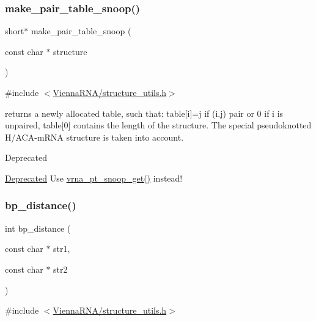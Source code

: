\subsubsection{\texorpdfstring{make\+\_\+pair\+\_\+table\+\_\+snoop()}{make\_pair\_table\_snoop()}}
{\footnotesize\ttfamily short$\ast$ make\+\_\+pair\+\_\+table\+\_\+snoop (\begin{DoxyParamCaption}\item[{const char $\ast$}]{structure }\end{DoxyParamCaption})}



{\ttfamily \#include $<$\hyperlink{structure__utils_8h}{Vienna\+R\+N\+A/structure\+\_\+utils.\+h}$>$}

returns a newly allocated table, such that\+: table\mbox{[}i\mbox{]}=j if (i.\+j) pair or 0 if i is unpaired, table\mbox{[}0\mbox{]} contains the length of the structure. The special pseudoknotted H/\+A\+C\+A-\/m\+R\+NA structure is taken into account. \begin{DoxyRefDesc}{Deprecated}
\item[\hyperlink{deprecated__deprecated000142}{Deprecated}]Use \hyperlink{group__struct__utils_gaef0f7e1a6c00c81a349973de53039dda}{vrna\+\_\+pt\+\_\+snoop\+\_\+get()} instead! \end{DoxyRefDesc}
\mbox{\label{group__struct__utils_ga6ebbcd29a754f0e4f1a66d1fd84184db}} 
\subsubsection{\texorpdfstring{bp\+\_\+distance()}{bp\_distance()}}
{\footnotesize\ttfamily int bp\+\_\+distance (\begin{DoxyParamCaption}\item[{const char $\ast$}]{str1,  }\item[{const char $\ast$}]{str2 }\end{DoxyParamCaption})}



{\ttfamily \#include $<$\hyperlink{structure__utils_8h}{Vienna\+R\+N\+A/structure\+\_\+utils.\+h}$>$}



